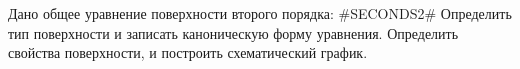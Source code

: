 Дано общее уравнение поверхности второго порядка:
#SECONDS2#
Определить тип поверхности и записать каноническую форму уравнения. Определить свойства поверхности, и построить схематический график. 
